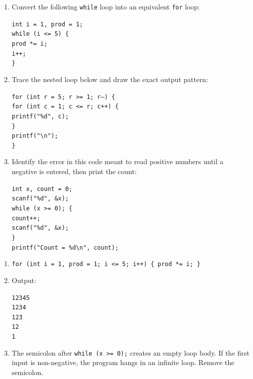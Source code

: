 \documentclass[11pt]{article}
\begin{document}
\begin{exercice}
\begin{enumerate}
  \item Convert the following \texttt{while} loop into an equivalent \texttt{for} loop:
  \begin{center}
  \texttt{int i = 1, prod = 1;} \\
  \texttt{while (i <= 5) \{} \\
  \qquad \texttt{prod *= i;} \\
  \qquad \texttt{i++;} \\
  \texttt{\}}
  \end{center}
  \item Trace the nested loop below and draw the exact output pattern:
  \begin{center}
  \texttt{for (int r = 5; r >= 1; r--) \{} \\
  \qquad \texttt{for (int c = 1; c <= r; c++) \{} \\
  \qquad\qquad \texttt{printf("\%d", c);} \\
  \qquad \texttt{\}} \\
  \qquad \texttt{printf("\textbackslash n");} \\
  \texttt{\}}
  \end{center}
  \item Identify the error in this code meant to read positive numbers until a negative is entered, then print the count:
  \begin{center}
  \texttt{int x, count = 0;} \\
  \texttt{scanf("\%d", \&x);} \\
  \texttt{while (x >= 0); \{} \\
  \qquad \texttt{count++;} \\
  \qquad \texttt{scanf("\%d", \&x);} \\
  \texttt{\}} \\
  \texttt{printf("Count = \%d\textbackslash n", count);}
  \end{center}
\end{enumerate}
\end{exercice}

\begin{corrige}[Exercise 1]
\begin{enumerate}
  \item \texttt{for (int i = 1, prod = 1; i <= 5; i++) \{ prod *= i; \}} \\
  \item Output:
  \begin{center}
  \texttt{12345}\\
  \texttt{1234}\\
  \texttt{123}\\
  \texttt{12}\\
  \texttt{1}
  \end{center}
  \item The semicolon after \texttt{while (x >= 0);} creates an empty loop body. If the first input is non-negative, the program hangs in an infinite loop. Remove the semicolon.
\end{enumerate}
\end{corrige}
\end{document}

